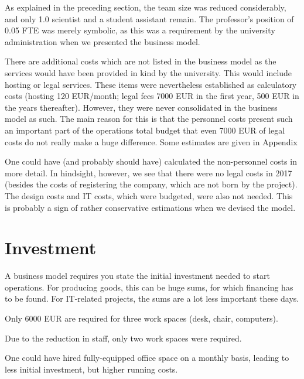 \documentclass[nonflat,smallfont
]{langsci/langscibook}
\newcommand{\background}[1]{ 
  \vspace{5mm}
  \renewcommand{\tblslinecolour}{lsDarkBlue}
  \tblssy[red]{explore2}{Background}{\vspace*{-5mm}#1}
}
\newcommand{\langscisolution}[1]{
  \renewcommand{\tblslinecolour}{lsLightBlue}
  \tblssy{langsci}{LangSci solution}{\vspace*{-5mm}#1}
}
\newcommand{\evaluation}[1]{
  \renewcommand{\tblslinecolour}{lsLightOrange}
  \tblssy{receipt}{Evaluation}{\vspace*{-5mm}#1}
}
\newcommand{\othersolutions}[1]{
  \renewcommand{\tblslinecolour}{lsDarkGreenOne}
  \tblssy{more}{Other solutions}{\vspace*{-5mm}#1}
}
\renewcommand{\tblssy}[4][black!12]{%
  \renewcommand{\langscisymbol}{#2}\renewcommand{\tblsboxcolor}{#1}
  \begin{mdframed}[style=yellowexercise,frametitle={#3}]
    #4
  \end{mdframed}
}
\begin{document}
\evaluation{As explained in the preceding section, the team size was reduced considerably, and only 1.0 scientist and a student assistant remain. The professor's position of 0.05 FTE was merely symbolic, as this was a requirement by the university administration when we presented the business model. 

There are additional costs which are not listed in the business model as the services would have been provided in kind by the university. This would include hosting or legal services. These items were nevertheless established as calculatory costs (hosting 120 EUR\slash month; legal fees 7000 EUR in the first year, 500 EUR in the years thereafter). However, they were never consolidated in the business model as such. The main reason for this is that the personnel costs present such an important part of the operations total budget that even 7000 EUR of legal costs do not really make a huge difference. Some estimates are given in Appendix \label{app:earningsforecast}
}
\othersolutions{
One could have (and probably should have) calculated the non-personnel costs in more detail.  In hindsight, however, we see that there were no legal costs in 2017 (besides the costs of registering the company, which are not born by the project). The design costs and IT costs, which were budgeted, were also not needed.  This is probably a sign of rather conservative estimations when we devised the model. 
}
  

\section{Investment}
\vspace*{5mm}
\background{A business model requires you state the initial investment needed to start operations. For producing goods, this can be huge sums, for which financing has to be found. For IT-related projects, the sums are a lot less important these days.}
\langscisolution{
Only 6000 EUR are required for three work spaces (desk, chair, computers). 
}
\evaluation{Due to the reduction in staff, only two work spaces were required.}
\othersolutions{
One could have hired fully-equipped office space on a monthly basis, leading to less initial investment, but higher running costs. 
}
 

% 
%  
% 
% 
%  
\end{document}
